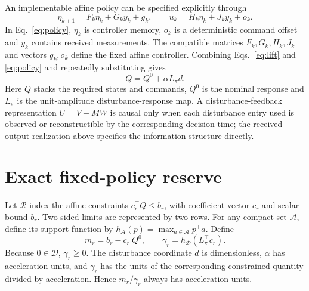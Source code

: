 \documentclass[11pt]{article}
\begin{document}
An implementable affine policy can be specified explicitly through
\begin{equation}
\eta_{k+1}=F_k\eta_k+G_ky_k+g_k,\qquad
u_k=H_k\eta_k+J_ky_k+o_k.
\label{eq:policy}
\end{equation}
In Eq.~\eqref{eq:policy}, $\eta_k$ is controller memory, $o_k$ is a deterministic command offset and $y_k$ contains received measurements. The compatible matrices $F_k,G_k,H_k,J_k$ and vectors $g_k,o_k$ define the fixed affine controller. Combining Eqs.~\eqref{eq:lift} and \eqref{eq:policy} and repeatedly substituting gives
\begin{equation}
Q=Q^0+\alpha L_\pi d.
\label{eq:closed}
\end{equation}
Here $Q$ stacks the required states and commands, $Q^0$ is the nominal response and $L_\pi$ is the unit-amplitude disturbance-response map. A disturbance-feedback representation $U=V+MW$ is causal only when each disturbance entry used is observed or reconstructible by the corresponding decision time; the received-output realization above specifies the information structure directly.

\section{Exact fixed-policy reserve}
Let $\mathcal R$ index the affine constraints $c_r^\top Q\leq b_r$, with coefficient vector $c_r$ and scalar bound $b_r$. Two-sided limits are represented by two rows. For any compact set $\mathcal A$, define its support function by $h_{\mathcal A}(p)=\max_{a\in\mathcal A}p^\top a$. Define
\begin{equation}
m_r=b_r-c_r^\top Q^0,\qquad \gamma_r=h_{\mathcal D}(L_\pi^\top c_r).
\end{equation}
Because $0\in\mathcal D$, $\gamma_r\geq0$. The disturbance coordinate $d$ is dimensionless, $\alpha$ has acceleration units, and $\gamma_r$ has the units of the corresponding constrained quantity divided by acceleration. Hence $m_r/\gamma_r$ always has acceleration units.
\end{document}
